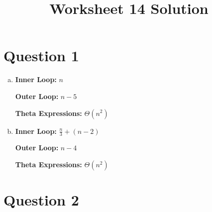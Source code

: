 \documentclass[12pt]{article}
\begin{document}
\title{Worksheet 14 Solution}
\maketitle

\section*{Question 1}
\begin{enumerate}[a.]
    \item

    \textbf{Inner Loop:} $n$

    \textbf{Outer Loop:} $n - 5$

    \textbf{Theta Expressions:} $\Theta (n^2)$

    \item

    \textbf{Inner Loop:} $\displaystyle \frac{n}{3} + (n - 2)$

    \textbf{Outer Loop:} $n - 4$

    \textbf{Theta Expressions:} $\Theta (n^2)$

\end{enumerate}

\section*{Question 2}
\end{document}
